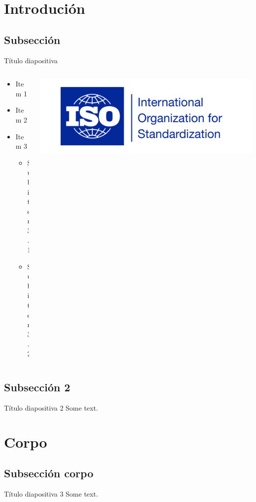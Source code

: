 \section{Introdución}
\subsection{Subsección}
\begin{frame}{Título diapositiva}
	\begin{columns}
		\begin{column}{0.6\textwidth}
			\begin{itemize}
				\item Item 1
				\item Item 2
				\item Item 3
				\begin{itemize}
					\item Subitem 3.1
					\item Subitem 3.2
				\end{itemize}
			\end{itemize}
		\end{column}
		\begin{column}{0.4\textwidth}
			\includegraphics[width=1\textwidth]{imaxes/iso.png}
		\end{column}
	\end{columns}
\end{frame}


\subsection{Subsección 2}
\begin{frame}{Título diapositiva 2}
	Some text.\\
\end{frame}


\section{Corpo}
\subsection{Subsección corpo}
\begin{frame}{Título diapositiva 3}
	Some text.\\
\end{frame}



